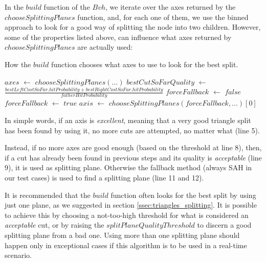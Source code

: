\documentclass{PoliMi_MasterThesis}
\newcommand*\Let[2]{\State #1 $\gets$ #2}
\begin{document}
In the $build$ function of the $Bvh$, we iterate over the axes returned by the $chooseSplittingPlanes$ function, and, for each one of them, we use the binned approach to look for a good way of splitting the node into two children. However, some of the properties listed above, can influence what axes returned by $chooseSplittingPlanes$ are actually used:

\begin{algorithm}[H]
	\caption{How the $build$ function chooses what axes to use to look for the best split.}
	\begin{algorithmic}[1]
		\Let{$axes$}{$chooseSplittingPlanes(...)$}
			\Let{$bestCutSoFarQuality$}{$\frac{bestLeftCostSoFar.hitProbability + bestRightCostSoFar.hitProbability}{fatherHitProbability}$}
				\EndIf
				\Let{$forceFallback$}{$false$}
					\EndIf
				\EndIf
				\Let{$forceFallback$}{$true$}
				\Let{$axis$}{$chooseSplittingPlanes(forceFallback, ...)[0]$}
		\EndFor
	\end{algorithmic}
\end{algorithm} 

In simple words, if an axis is \textit{excellent}, meaning that a very good triangle split has been found by using it, no more cuts are attempted, no matter what (line 5).

Instead, if no more axes are good enough (based on the threshold at line 8), then, if a cut has already been found in previous steps and its quality is \textit{acceptable} (line 9), it is used as splitting plane. Otherwise the fallback method (always SAH in our test cases) is used to find a splitting plane (line 11 and 12).

It is recommended that the $build$ function often looks for the best split by using just one plane, as we suggested in section \ref{ssec:triangles_splitting}. It is possible to achieve this by choosing a not-too-high threshold for what is considered an \textit{acceptable} cut, or by raising the $splitPlaneQualityThreshold$ to discern a good splitting plane from a bad one. Using more than one splitting plane should happen only in exceptional cases if this algorithm is to be used in a real-time scenario.
\end{document}
